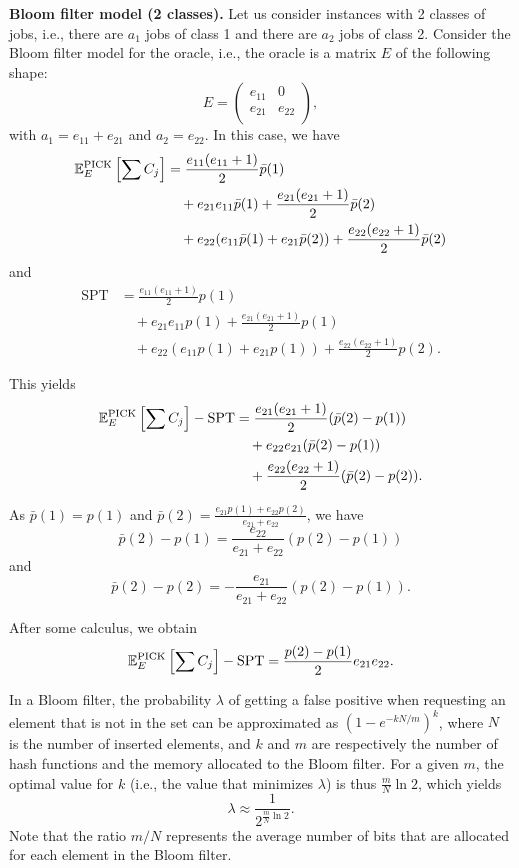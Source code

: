 \documentclass{article}
\begin{document}
\noindent\textbf{Bloom filter model (2 classes).}
Let us consider instances with 2 classes of jobs, i.e., there are \(a_1\) jobs of class 1 and there are \(a_2\) jobs of class 2.
Consider the Bloom filter model for the oracle, i.e., the oracle is a matrix \(E\) of the following shape:
\[
    E=\begin{pmatrix}
        e_{11} & 0 \\
        e_{21} & e_{22} \\
    \end{pmatrix},
\]
with \(a_1=e_{11}+e_{21}\) and \(a_2=e_{22}\).
In this case, we have
\begin{align*}
    \mathbb{E}_E^{\text{PICK}}\left[\sum C_j\right]
    &=\frac{e_{11}(e_{11}+1)}{2}\bar{p}(1) \\
    &\quad+e_{21}e_{11}\bar{p}(1)+\frac{e_{21}(e_{21}+1)}{2}\bar{p}(2) \\
    &\quad+e_{22}(e_{11}\bar{p}(1)+e_{21}\bar{p}(2))+\frac{e_{22}(e_{22}+1)}{2}\bar{p}(2)
\end{align*}
and
\begin{align*}
    \text{SPT}
    &=\frac{e_{11}(e_{11}+1)}{2}p(1) \\
    &\quad+e_{21}e_{11}p(1)+\frac{e_{21}(e_{21}+1)}{2}p(1) \\
    &\quad+e_{22}(e_{11}p(1)+e_{21}p(1))+\frac{e_{22}(e_{22}+1)}{2}p(2).
\end{align*}

This yields
\begin{align*}
    \mathbb{E}_E^{\text{PICK}}\left[\sum C_j\right]-\text{SPT}
    &=\frac{e_{21}(e_{21}+1)}{2}(\bar{p}(2)-p(1)) \\
    &\quad+e_{22}e_{21}(\bar{p}(2)-p(1)) \\
    &\quad+\frac{e_{22}(e_{22}+1)}{2}(\bar{p}(2)-p(2)).
\end{align*}

As \(\bar{p}(1)=p(1)\) and \(\bar{p}(2)=\frac{e_{21}p(1)+e_{22}p(2)}{e_{21}+e_{22}}\), we have
\[
    \bar{p}(2)-p(1)=\frac{e_{22}}{e_{21}+e_{22}}(p(2)-p(1))
\]
and
\[
    \bar{p}(2)-p(2)=-\frac{e_{21}}{e_{21}+e_{22}}(p(2)-p(1)).
\]

After some calculus, we obtain
\begin{equation}
    \label{eq.diff}
    \mathbb{E}_E^{\text{PICK}}\left[\sum C_j\right]-\text{SPT}=\frac{p(2)-p(1)}{2}e_{21}e_{22}.
\end{equation}

In a Bloom filter, the probability \(\lambda\) of getting a false positive when requesting an element that is not in the set can be approximated as \(\left(1-e^{-kN/m}\right)^k\), where \(N\) is the number of inserted elements, and \(k\) and \(m\) are respectively the number of hash functions and the memory allocated to the Bloom filter.
For a given \(m\), the optimal value for \(k\) (i.e., the value that minimizes \(\lambda\)) is thus \(\frac{m}{N}\ln 2\), which yields
\[
    \lambda\approx\frac{1}{2^{\frac{m}{N}\ln 2}}.
\]
Note that the ratio \(m/N\) represents the average number of bits that are allocated for each element in the Bloom filter.
\end{document}
